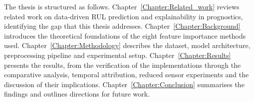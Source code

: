 The thesis is structured as follows. Chapter~\ref{Chapter:Related_work} reviews related work on data-driven RUL prediction and explainability in prognostics, identifying the gap that this thesis addresses. Chapter~\ref{Chapter:Background} introduces the theoretical foundations of the eight feature importance methods used. Chapter~\ref{Chapter:Methodology} describes the dataset, model architecture, preprocessing pipeline and experimental setup. Chapter~\ref{Chapter:Results} presents the results, from the verification of the implementations through the comparative analysis, temporal attribution, reduced sensor experiments and the discussion of their implications. Chapter~\ref{Chapter:Conclusion} summarises the findings and outlines directions for future work.


